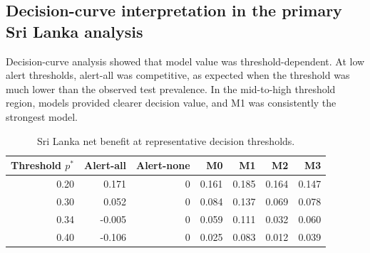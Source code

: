 \documentclass[11pt,a4paper]{article}
\begin{document}
\subsection{Decision-curve interpretation in the primary Sri Lanka analysis}
\label{subsec:srilanka-dca}

Decision-curve analysis showed that model value was threshold-dependent. At low alert thresholds, alert-all was competitive, as expected when the threshold was much lower than the observed test prevalence. In the mid-to-high threshold region, models provided clearer decision value, and M1 was consistently the strongest model.

\begin{table}[htbp]
\centering
\caption{Sri Lanka net benefit at representative decision thresholds.}
\label{tab:srilanka-net-benefit-thresholds}
\small
\begin{tabular}{rrrrrrr}
\toprule
Threshold $p^*$ & Alert-all & Alert-none & M0 & M1 & M2 & M3 \\
\midrule
0.20 & 0.171 & 0 & 0.161 & 0.185 & 0.164 & 0.147 \\
0.30 & 0.052 & 0 & 0.084 & 0.137 & 0.069 & 0.078 \\
0.34 & -0.005 & 0 & 0.059 & 0.111 & 0.032 & 0.060 \\
0.40 & -0.106 & 0 & 0.025 & 0.083 & 0.012 & 0.039 \\
\bottomrule
\end{tabular}
\end{table}

\end{document}
